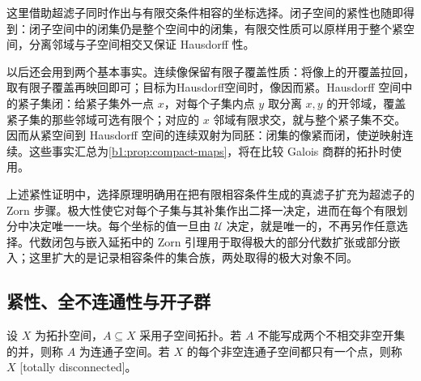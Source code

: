 这里借助超滤子同时作出与有限交条件相容的坐标选择。闭子空间的紧性也随即得到：闭子空间中的闭集仍是整个空间中的闭集，有限交性质可以原样用于整个紧空间，分离邻域与子空间相交又保证 Hausdorff 性。

\ProseParagraphBreak
以后还会用到两个基本事实。连续像保留有限子覆盖性质：将像上的开覆盖拉回，取有限子覆盖再映回即可；目标为Hausdorff空间时，像因而紧。Hausdorff 空间中的紧子集闭：给紧子集外一点 \(x\)，对每个子集内点 \(y\) 取分离 \(x,y\) 的开邻域，覆盖紧子集的那些邻域可选有限个；对应的 \(x\) 邻域有限求交，就与整个紧子集不交。因而从紧空间到 Hausdorff 空间的连续双射为同胚：闭集的像紧而闭，使逆映射连续。这些事实汇总为\cref{b1:prop:compact-maps}，将在比较 Galois 商群的拓扑时使用。

\ProseParagraphBreak
上述紧性证明中，选择原理明确用在把有限相容条件生成的真滤子扩充为超滤子的 Zorn 步骤。极大性使它对每个子集与其补集作出二择一决定，进而在每个有限划分中决定唯一一块。每个坐标的值一旦由 \(\mathcal U\) 决定，就是唯一的，不再另作任意选择。代数闭包与嵌入延拓中的 Zorn 引理用于取得极大的部分代数扩张或部分嵌入；这里扩大的是记录相容条件的集合族，两处取得的极大对象不同。

\subsection{紧性、全不连通性与开子群}
\label{b1:subsec:2202:03}
设 \(X\) 为拓扑空间，\(A\subseteq X\) 采用子空间拓扑。若 \(A\) 不能写成两个不相交非空开集的并，则称 \(A\) 为连通子空间。若 \(X\) 的每个非空连通子空间都只有一个点，则称 \(X\) [totally disconnected]。

